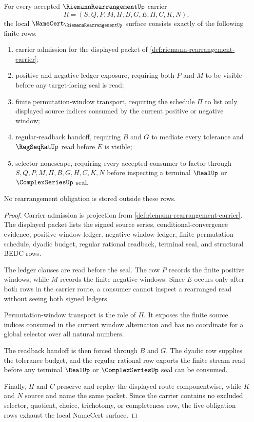 \begin{theorem}
\label{thm:riemann-rearrangement-namecert-obligations}
For every accepted $\RiemannRearrangementUp$ carrier
$$
R=(S,Q,P,M,\Pi,B,G,E,H,C,K,N),
$$
the local $\NameCert_{\RiemannRearrangementUp}$ surface consists exactly of the following finite rows:
\begin{enumerate}
\item carrier admission for the displayed packet of \autoref{def:riemann-rearrangement-carrier};
\item positive and negative ledger exposure, requiring both $P$ and $M$ to be visible before any target-facing seal is read;
\item finite permutation-window transport, requiring the schedule $\Pi$ to list only displayed source indices consumed by the current positive or negative window;
\item regular-readback handoff, requiring $B$ and $G$ to mediate every tolerance and $\RegSeqRatUp$ read before $E$ is visible;
\item selector nonescape, requiring every accepted consumer to factor through $S,Q,P,M,\Pi,B,G,H,C,K,N$ before inspecting a terminal $\RealUp$ or $\ComplexSeriesUp$ seal.
\end{enumerate}
No rearrangement obligation is stored outside these rows.
\end{theorem}
\begin{proof}
Carrier admission is projection from \autoref{def:riemann-rearrangement-carrier}. The displayed packet lists the signed source series, conditional-convergence evidence, positive-window ledger, negative-window ledger, finite permutation schedule, dyadic budget, regular rational readback, terminal seal, and structural BEDC rows.

The ledger clauses are read before the seal. The row $P$ records the finite positive windows, while $M$ records the finite negative windows. Since $E$ occurs only after both rows in the carrier route, a consumer cannot inspect a rearranged read without seeing both signed ledgers.

Permutation-window transport is the role of $\Pi$. It exposes the finite source indices consumed in the current window alternation and has no coordinate for a global selector over all natural numbers.

The readback handoff is then forced through $B$ and $G$. The dyadic row supplies the tolerance budget, and the regular rational row exports the finite stream read before any terminal $\RealUp$ or $\ComplexSeriesUp$ seal can be consumed.

Finally, $H$ and $C$ preserve and replay the displayed route componentwise, while $K$ and $N$ source and name the same packet. Since the carrier contains no excluded selector, quotient, choice, trichotomy, or completeness row, the five obligation rows exhaust the local NameCert surface.
\end{proof}

